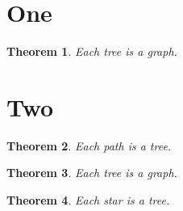 \documentclass{article}
\newtheorem{thm}{Theorem}[section]
\newenvironment{restate}[1]
    {\def\thethm{#1}\begin{thm}}
    {\end{thm}\addtocounter{thm}{-1}}
\begin{document}
\section{One}
\begin{thm}\label{main} Each tree is a graph. \end{thm}
\section{Two}
\begin{thm} Each path is a tree. \end{thm}
\begin{restate}{\ref{main}}
Each tree is a graph.
\end{restate}
\begin{thm} Each star is a tree. \end{thm}
\end{document}
